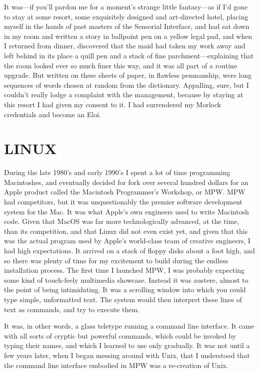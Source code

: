 \documentclass[
  fontsize=11pt,
  paper=landscape,
  twocolumn=true,
  pagesize=pdftex,
  headings=small,
  DIV=15,
  ]{scrartcl}
\begin{document}
It was---if you'll pardon me for a moment's strange little fantasy---as
if I'd gone to stay at some resort, some exquisitely designed and
art-directed hotel, placing myself in the hands of past masters of the
Sensorial Interface, and had sat down in my room and written a story in
ballpoint pen on a yellow legal pad, and when I returned from dinner,
discovered that the maid had taken my work away and left behind in its
place a quill pen and a stack of fine parchment---explaining that the
room looked ever so much finer this way, and it was all part of a
routine upgrade. But written on these sheets of paper, in flawless
penmanship, were long sequences of words chosen at random from the
dictionary. Appalling, sure, but I couldn't really lodge a complaint
with the management, because by staying at this resort I had given my
consent to it. I had surrendered my Morlock credentials and become an
Eloi.

\section{LINUX}

During the late 1980's and early 1990's I spent a lot of time
programming Macintoshes, and eventually decided for fork over several
hundred dollars for an Apple product called the Macintosh Programmer's
Workshop, or MPW. MPW had competitors, but it was unquestionably the
premier software development system for the Mac. It was what Apple's own
engineers used to write Macintosh code. Given that MacOS was far more
technologically advanced, at the time, than its competition, and that
Linux did not even exist yet, and given that this was the actual program
used by Apple's world-class team of creative engineers, I had high
expectations. It arrived on a stack of floppy disks about a foot high,
and so there was plenty of time for my excitement to build during the
endless installation process. The first time I launched MPW, I was
probably expecting some kind of touch-feely multimedia showcase. Instead
it was austere, almost to the point of being intimidating. It was a
scrolling window into which you could type simple, unformatted text. The
system would then interpret these lines of text as commands, and try to
execute them.

It was, in other words, a glass teletype running a command line
interface. It came with all sorts of cryptic but powerful commands,
which could be invoked by typing their names, and which I learned to use
only gradually. It was not until a few years later, when I began messing
around with Unix, that I understood that the command line interface
embodied in MPW was a re-creation of Unix.
\end{document}
